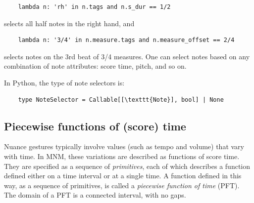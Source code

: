 \documentclass[letterpaper, 12pt]{article}
\begin{document}
\begin{small}\begin{singlespace}\vspace{-18px}\begin{verbatim}
    lambda n: 'rh' in n.tags and n.s_dur == 1/2
\end{verbatim}\end{singlespace}\end{small}\vspace{-18px}\noindent
selects all half notes in the right hand, and
\begin{small}\begin{singlespace}\vspace{-18px}\begin{verbatim}
    lambda n: '3/4' in n.measure.tags and n.measure_offset == 2/4
\end{verbatim}\end{singlespace}\end{small}\vspace{-18px}\noindent
selects notes on the 3rd beat of 3/4 measures.
One can select notes based on any combination of note attributes:
score time, pitch, and so on.

In Python, the type of note selectors is:
\begin{small}\begin{singlespace}\vspace{-18px}\begin{verbatim}
    type NoteSelector = Callable[[\texttt{Note}], bool] | None
\end{verbatim}\end{singlespace}\end{small}\vspace{-18px}\noindent

\subsection{Piecewise functions of (score) time}

Nuance gestures typically involve values
(such as tempo and volume) that vary with time.
In MNM, these variations are described as functions of score time.
They are specified as a sequence of \textit{primitives},
each of which describes a function defined
either on a time interval or at a single time.
A function defined in this way, as a sequence of primitives,
is called a \textit{piecewise function of time} (PFT).
The domain of a PFT is a connected interval, with no gaps.
\end{document}
